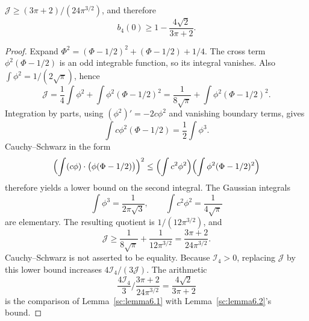 \begin{lemma}\label{sc:lemma6.2}
\(\mathcal J\ge (3\pi+2)/(24\pi^{3/2})\), and therefore
\[
b_4(0)\ge 1-\frac{4\sqrt 2}{3\pi+2}.
\]

\end{lemma}
\begin{proof}
Expand \(\Phi^2=(\Phi-1/2)^2+(\Phi-1/2)+1/4\). The cross term \(\phi^2(\Phi-1/2)\) is an odd integrable function, so its integral vanishes. Also \(\int\phi^2=1/(2\sqrt\pi)\), hence
\[
\mathcal J=\frac14\int\phi^2+\int\phi^2(\Phi-1/2)^2=\frac{1}{8\sqrt\pi}+\int\phi^2(\Phi-1/2)^2.
\]
Integration by parts, using \((\phi^2)'=-2c\phi^2\) and vanishing boundary terms, gives
\[
\int c\phi^2(\Phi-1/2)=\frac12\int\phi^3.
\]
Cauchy--Schwarz in the form
\[
\Bigl(\int (c\phi)\cdot\bigl(\phi(\Phi-1/2)\bigr)\Bigr)^2
\le\Bigl(\int c^2\phi^2\Bigr)\Bigl(\int\phi^2(\Phi-1/2)^2\Bigr)
\]
therefore yields a lower bound on the second integral. The Gaussian integrals
\[
\int\phi^3=\frac{1}{2\pi\sqrt 3},\qquad \int c^2\phi^2=\frac{1}{4\sqrt\pi}
\]
are elementary. The resulting quotient is \(1/(12\pi^{3/2})\), and
\[
\mathcal J\ge\frac{1}{8\sqrt\pi}+\frac{1}{12\pi^{3/2}}=\frac{3\pi+2}{24\pi^{3/2}}.
\]
Cauchy--Schwarz is not asserted to be equality. Because \(\mathcal I_4>0\), replacing \(\mathcal J\) by this lower bound increases \(4\mathcal I_4/(3\mathcal J)\). The arithmetic
\[
\frac{4\mathcal I_4}{3}\Big/\frac{3\pi+2}{24\pi^{3/2}}=\frac{4\sqrt 2}{3\pi+2}
\]
is the comparison of Lemma~\ref{sc:lemma6.1} with Lemma~\ref{sc:lemma6.2}'s bound.

\end{proof}

